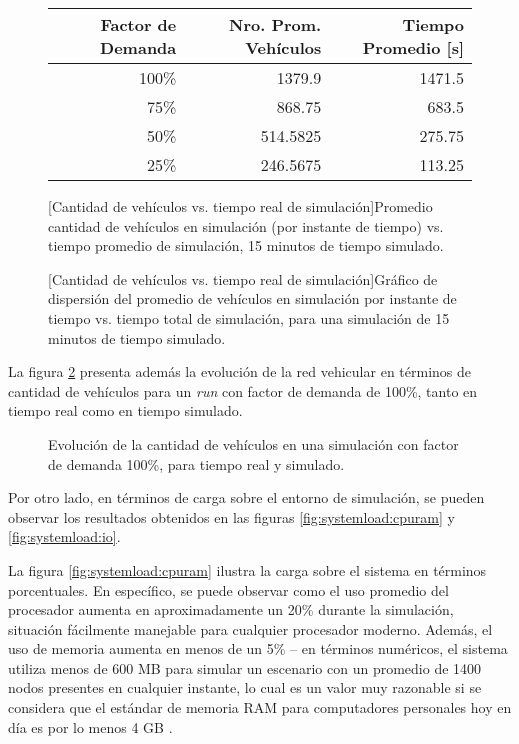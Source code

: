 \begin{figure}[htpb]
    \centering
    \begin{tabular}{@{}rrr@{}}
        \textbf{Factor de Demanda} & \textbf{Nro. Prom. Vehículos} & \textbf{Tiempo Promedio [s]} \\ \midrule
        100\%           & 1379.9          & 1471.5              \\ %
        75\%            & 868.75          & 683.5               \\ %
        50\%            & 514.5825        & 275.75              \\ %
        25\%            & 246.5675        & 113.25              \\ \bottomrule
    \end{tabular}
    [Cantidad de vehículos vs. tiempo real de simulación]{Promedio cantidad de vehículos en simulación (por instante de tiempo) vs. tiempo promedio de simulación, 15 minutos de tiempo simulado.}
    \label{table:vehiclesvstime}
    
    \vspace{15mm}
    
    
    [Cantidad de vehículos vs. tiempo real de simulación]{Gráfico de dispersión del promedio de vehículos en simulación por instante de tiempo vs. tiempo total de simulación, para una simulación de 15 minutos de tiempo simulado.}
    \label{fig:vehiclesvstime}
\end{figure}

La figura \ref{fig:timevsvehicles_evolution} presenta además la evolución de la red vehicular en términos de cantidad de vehículos para un \emph{run} con factor de demanda de 100\%, tanto en tiempo real como en tiempo simulado. 

\begin{figure}[h]
    \centering
    
    \caption[Evolución temporal de la cantidad de vehículos en la simulación.]{Evolución de la cantidad de vehículos en una simulación con factor de demanda 100\%, para tiempo real y simulado.}
    \label{fig:timevsvehicles_evolution}
\end{figure}

Por otro lado, en términos de carga sobre el entorno de simulación, se pueden observar los resultados obtenidos en las figuras \ref{fig:systemload:cpuram} y \ref{fig:systemload:io}. 

La figura \ref{fig:systemload:cpuram} ilustra la carga sobre el sistema en términos porcentuales. En específico, se puede observar como el uso promedio del procesador aumenta en aproximadamente un 20\% durante la simulación, situación fácilmente manejable para cualquier procesador moderno. Además, el uso de memoria aumenta en menos de un 5\% -- en términos numéricos, el sistema utiliza menos de 600 MB para simular un escenario con un promedio de 1400 nodos presentes en cualquier instante, lo cual es un valor muy razonable si se considera que el estándar de memoria RAM para computadores personales hoy en día es por lo menos 4 GB \autocite{steamhwsurvey, unityhardwaresurvey}.

